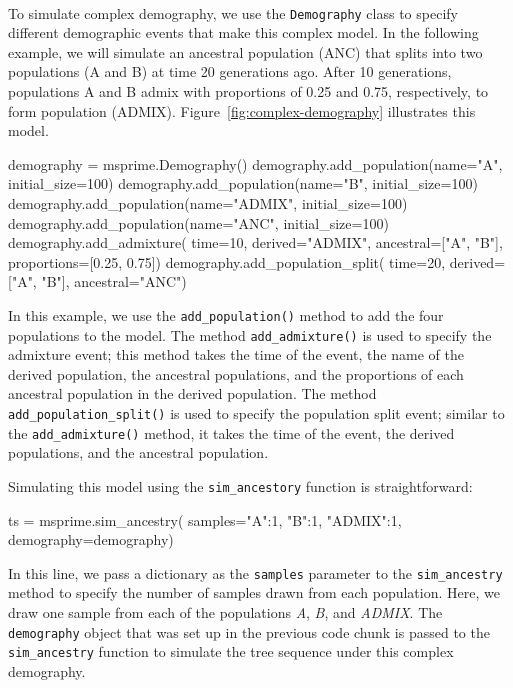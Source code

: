 \documentclass[graybox]{svmult}
\begin{document}
\label{Complex-demography} \

To simulate complex demography, we use the \texttt{Demography} class to specify different
demographic events that make this complex model. In the following example, we will
simulate an ancestral population (ANC) that splits into two populations (A and B) at time
20 generations ago. After 10 generations, populations A and B admix with proportions of 0.25
and 0.75, respectively, to form population (ADMIX). Figure~\ref{fig:complex-demography}
illustrates this model.

\begin{pythoncode}
    demography = msprime.Demography()
    demography.add_population(name="A", initial_size=100)
    demography.add_population(name="B", initial_size=100)
    demography.add_population(name="ADMIX", initial_size=100)
    demography.add_population(name="ANC", initial_size=100)
    demography.add_admixture(
        time=10, derived="ADMIX", ancestral=["A", "B"],
        proportions=[0.25, 0.75])
    demography.add_population_split(
        time=20, derived=["A", "B"], ancestral="ANC")
\end{pythoncode}

In this example, we use the \texttt{add\_population()} method to add the four populations
to the model. The method \texttt{add\_admixture()} is used to specify the admixture event;
this method takes the time of the event, the name of the derived population, the ancestral
populations, and the proportions of each ancestral population in the derived population.
The method \texttt{add\_population\_split()} is used to specify the population split event;
similar to the \texttt{add\_admixture()} method, it takes the time of the event, the derived
populations, and the ancestral population.

Simulating this model using the \texttt{sim\_ancestory} function is straightforward:
\begin{pythoncode}
ts = msprime.sim_ancestry(
    samples={"A":1, "B":1, "ADMIX":1}, demography=demography)
\end{pythoncode}

In this line, we pass a dictionary as the \texttt{samples} parameter to the \texttt{sim\_ancestry} method to
specify the number of samples drawn from each population. Here, we draw one sample from each of the populations
\emph{A}, \emph{B}, and \emph{ADMIX}. The \texttt{demography} object that was set up in the previous code chunk
is passed to the \texttt{sim\_ancestry} function to simulate the tree sequence under this complex demography.
\end{document}
